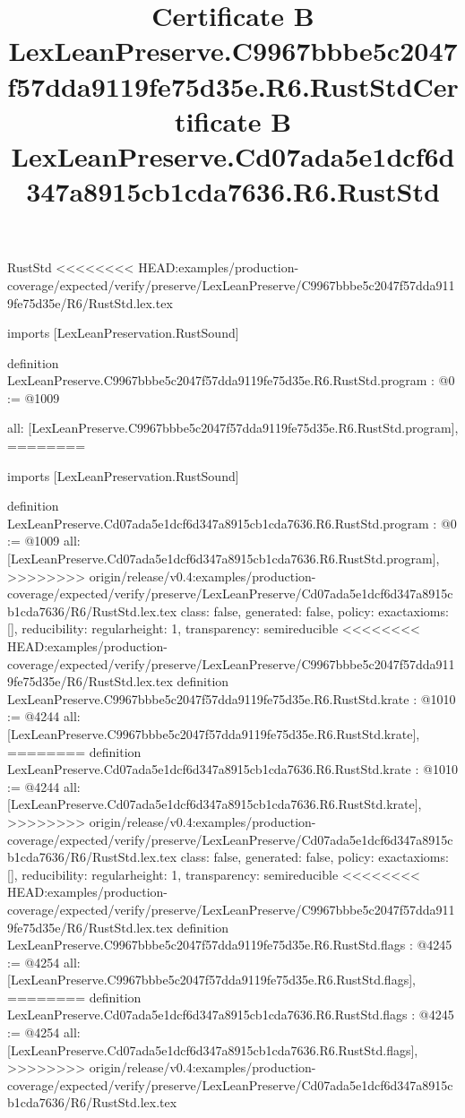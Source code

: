 \begin{lexlean}{RustStd}
<<<<<<<< HEAD:examples/production-coverage/expected/verify/preserve/LexLeanPreserve/C9967bbbe5c2047f57dda9119fe75d35e/R6/RustStd.lex.tex
\title{Certificate B LexLeanPreserve.C9967bbbe5c2047f57dda9119fe75d35e.R6.RustStd}
\begin{coremodule}
imports [LexLeanPreservation.RustSound]

definition LexLeanPreserve.C9967bbbe5c2047f57dda9119fe75d35e.R6.RustStd.program : @0 := @1009 {
  all: [LexLeanPreserve.C9967bbbe5c2047f57dda9119fe75d35e.R6.RustStd.program],
========
\title{Certificate B LexLeanPreserve.Cd07ada5e1dcf6d347a8915cb1cda7636.R6.RustStd}
\begin{coremodule}
imports [LexLeanPreservation.RustSound]

definition LexLeanPreserve.Cd07ada5e1dcf6d347a8915cb1cda7636.R6.RustStd.program : @0 := @1009 {
  all: [LexLeanPreserve.Cd07ada5e1dcf6d347a8915cb1cda7636.R6.RustStd.program],
>>>>>>>> origin/release/v0.4:examples/production-coverage/expected/verify/preserve/LexLeanPreserve/Cd07ada5e1dcf6d347a8915cb1cda7636/R6/RustStd.lex.tex
  class: false,
  generated: false,
  policy: exact{axioms: []},
  reducibility: regular{height: 1},
  transparency: semireducible
}
<<<<<<<< HEAD:examples/production-coverage/expected/verify/preserve/LexLeanPreserve/C9967bbbe5c2047f57dda9119fe75d35e/R6/RustStd.lex.tex
definition LexLeanPreserve.C9967bbbe5c2047f57dda9119fe75d35e.R6.RustStd.krate : @1010 := @4244 {
  all: [LexLeanPreserve.C9967bbbe5c2047f57dda9119fe75d35e.R6.RustStd.krate],
========
definition LexLeanPreserve.Cd07ada5e1dcf6d347a8915cb1cda7636.R6.RustStd.krate : @1010 := @4244 {
  all: [LexLeanPreserve.Cd07ada5e1dcf6d347a8915cb1cda7636.R6.RustStd.krate],
>>>>>>>> origin/release/v0.4:examples/production-coverage/expected/verify/preserve/LexLeanPreserve/Cd07ada5e1dcf6d347a8915cb1cda7636/R6/RustStd.lex.tex
  class: false,
  generated: false,
  policy: exact{axioms: []},
  reducibility: regular{height: 1},
  transparency: semireducible
}
<<<<<<<< HEAD:examples/production-coverage/expected/verify/preserve/LexLeanPreserve/C9967bbbe5c2047f57dda9119fe75d35e/R6/RustStd.lex.tex
definition LexLeanPreserve.C9967bbbe5c2047f57dda9119fe75d35e.R6.RustStd.flags : @4245 := @4254 {
  all: [LexLeanPreserve.C9967bbbe5c2047f57dda9119fe75d35e.R6.RustStd.flags],
========
definition LexLeanPreserve.Cd07ada5e1dcf6d347a8915cb1cda7636.R6.RustStd.flags : @4245 := @4254 {
  all: [LexLeanPreserve.Cd07ada5e1dcf6d347a8915cb1cda7636.R6.RustStd.flags],
>>>>>>>> origin/release/v0.4:examples/production-coverage/expected/verify/preserve/LexLeanPreserve/Cd07ada5e1dcf6d347a8915cb1cda7636/R6/RustStd.lex.tex
}}}
\end{coremodule}}
\end{coremodule}
\end{lexlean}

